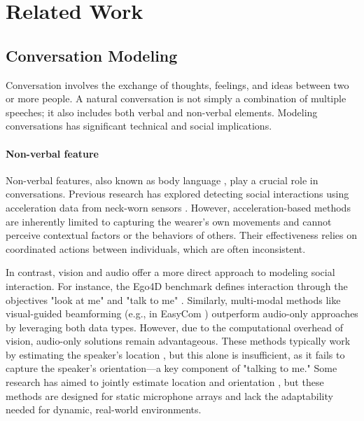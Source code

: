 \section{Related Work}
\label{sec:cohear_related}

\subsection{Conversation Modeling}
Conversation involves the exchange of thoughts, feelings, and ideas between two or more people. A natural conversation is not simply a combination of multiple speeches; it also includes both verbal and non-verbal elements. Modeling conversations has significant technical and social implications.

\paragraph{Non-verbal feature}
Non-verbal features, also known as body language \cite{d2010multimodal}, play a crucial role in conversations. Previous research has explored detecting social interactions using acceleration data from neck-worn sensors \cite{gedik2018detecting}. However, acceleration-based methods are inherently limited to capturing the wearer's own movements and cannot perceive contextual factors or the behaviors of others. Their effectiveness relies on coordinated actions between individuals, which are often inconsistent.

In contrast, vision and audio offer a more direct approach to modeling social interaction. For instance, the Ego4D benchmark defines interaction through the objectives "look at me" and "talk to me" \cite{grauman2022ego4d}. Similarly, multi-modal methods like visual-guided beamforming (e.g., in EasyCom \cite{donley2021easycom}) outperform audio-only approaches by leveraging both data types. However, due to the computational overhead of vision, audio-only solutions remain advantageous. These methods typically work by estimating the speaker's location \cite{wang2022nerc, yang2022deepear}, but this alone is insufficient, as it fails to capture the speaker's orientation—a key component of "talking to me." Some research has aimed to jointly estimate location and orientation \cite{ahuja2020direction}, but these methods are designed for static microphone arrays and lack the adaptability needed for dynamic, real-world environments.

